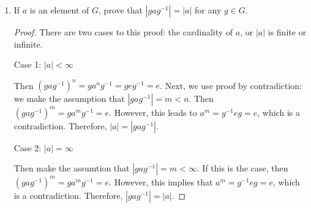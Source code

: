 \documentclass[a4paper]{article}
\begin{document}
\begin{enumerate}[leftmargin=*, label=(\textbf{\arabic*})]
\begin{proof}
Let some element $b \in Z(G)$.  Then we have that $ba = ab, \forall a \in G$.  Also, $b \in C(a), \forall a \in G$, and finally, $b \in \bigcap_{a \in G} C(a)$.  Thus, $Z(G) = \bigcap_{a \in G} C(a)$.  
\end{proof}

\item If $a$ is an element of $G$, prove that $|g a g^{-1}| = |a|$ for any $g \in G$.

\begin{proof}
There are two cases to this proof: the cardinality of $a$, or $|a|$ is finite or infinite.  

Case 1: $|a| < \infty$

Then $(gag^{-1})^{n}=ga^{n}g^{-1}=geg^{-1}=e$.  Next, we use proof by contradiction: we make the assumption that $|g a g^{-1}| = m < n$.  Then $(g a g^{-1})^{m}=ga^{m}g^{-1}=e$.  However, this leads to $a^{m}=g^{-1}eg = e$, which is a contradiction.  Therefore, $|a|=|gag^{-1}|$.  

Case 2: $|a| = \infty$

Then make the assumtion that $|gag^{-1}|= m < \infty$.  If this is the case, then $(gag^{-1})^{m}=ga^{m}g^{-1}=e$.  However, this implies that $a^{m}=g^{-1}eg=e$, which is a contradiction.  Therefore, $|gag^{-1}|=|a|$.  
\end{proof}


\end{enumerate}
\end{document}
